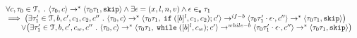 %
\begin{lem}
\label{lem:inv_test}
\[
\begin{array}{l}
	\forall c, \mathtt{\tau}_0 \in \mathcal{T}, ~.~ \langle \mathtt{\tau}_0, c \rangle \rightarrow^* \langle \mathtt{\tau}_0\mathtt{\tau}_1, \mathtt{skip} \rangle
	\land \exists \mathtt{\epsilon} = (x, l, n, v) \land \mathtt{\epsilon} \in_{\mathtt{e}} \mathtt{\tau}_1 \\
	\implies 
	\big( 
		\exists \mathtt{\tau}_1' \in \mathcal{T}, b, c', c_1, c_2, c'' ~.~
		\langle \mathtt{\tau}_0, c \rangle \rightarrow^* \langle \mathtt{\tau}_0\mathtt{\tau}_1, \;\mathtt{if}\; ([b]^l, c_1, c_2);c' \rangle \rightarrow^{if-b}
		\langle \mathtt{\tau}_0\mathtt{\tau}_1'\cdot \mathtt{\epsilon} \cdot, c'' \rangle \rightarrow^{*}
		\langle \mathtt{\tau}_0\mathtt{\tau}_1, \mathtt{skip} \rangle 
	\big)
	\\ \qquad \lor
	\big( 
		\exists \mathtt{\tau}_1' \in \mathcal{T}, b, c', c_w, c'' ~.~
		\langle \mathtt{\tau}_0, c \rangle \rightarrow^* \langle \mathtt{\tau}_0 \mathtt{\tau}_1, \;\mathtt{while}\;([b]^l, c_w);c' \rangle \rightarrow^{while-b}
		\langle \mathtt{\tau}_0\mathtt{\tau}_1'\cdot \mathtt{\epsilon} \cdot, c'' \rangle \rightarrow^{*}
		\langle \mathtt{\tau}_0\mathtt{\tau}_1, \mathtt{skip} \rangle
	\big)
\end{array}
\]
\end{lem}
%

